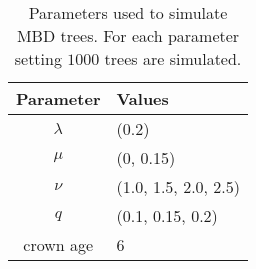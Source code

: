 \begin{table}[ht]
  \centering
  \begin{tabular}{ | c | l | }
    \hline
    \textbf{Parameter} &
    \textbf{Values} \\ 
    \hline
    $\lambda$ & (0.2) \\
    $\mu$ & (0, 0.15) \\
    $\nu$ & (1.0, 1.5, 2.0, 2.5) \\
    $q$ & (0.1, 0.15, 0.2) \\
    crown age & 6 \\
    \hline
  \end{tabular}
  \caption{
    Parameters used to simulate MBD trees. For each parameter setting $1000$ trees are simulated.
  }
  \label{tab:simulation_parameters}
\end{table}